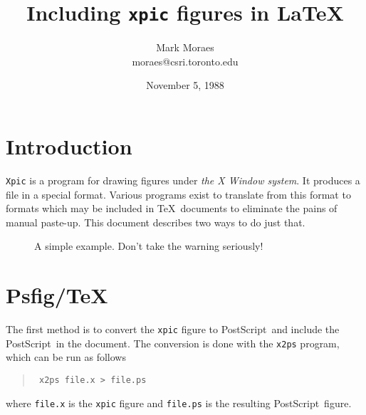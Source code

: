 %
%
%

\def\Ps{Post\-Script}
\newcommand{\postscript}{Post\-Script\ }
\newcommand{\psfigtex}{Psfig/\TeX\ }
\newcommand{\tex}{\TeX\ }
\newcommand{\nodeeqn}{$ {\displaystyle y = f \left( \sum_{i=1}^{n-1}
w_{i} x_{i} - \theta \right)} $}

\def\dbend{{\manual\char127}} %
\def\d@nger{\medbreak\begingroup\clubpenalty=10000
  \def\par{\endgraf\endgroup\mdebreak} \noindent\hang\hangafter=-1
  \hbox to0pt{\hskip-\hangindent\dbend\hfill}\ninepoint}
\outer\def\danger{\d@nger}


\title{Including {\tt xpic} figures in \LaTeX}
\author{Mark Moraes\\
moraes@csri.toronto.edu}
\date{November 5, 1988}    %

\maketitle                 %

\section{Introduction}

{\tt Xpic} is a program for drawing figures under {\em the X Window
system}. It produces a file in a special format. Various programs
exist to translate from this format to formats which may be included
in \tex documents to eliminate the pains of manual paste-up.
This document describes two ways to do just that.
\begin{figure}[h]
\centerline{}
\caption{A simple example. Don't take the warning seriously!}
\label{fig:texwarning}
\end{figure}
\section{\psfigtex} The first method is to convert the {\tt xpic}
figure to \postscript and include the \postscript in the document.
The conversion is done with the {\tt x2ps} program, which can be run
as follows
\begin{quote}
\tt
x2ps file.x > file.ps
\end{quote}
where {\tt file.x} is the {\tt xpic} figure and {\tt file.ps} is the
resulting \postscript figure.

